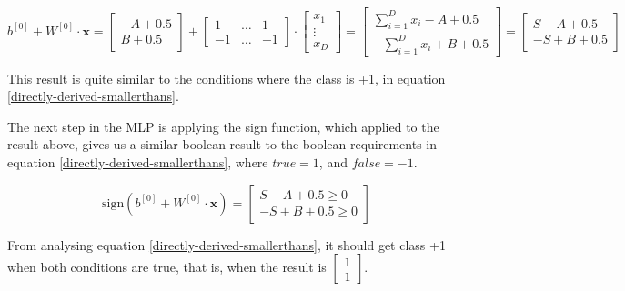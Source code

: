 \documentclass[12pt]{article}
\begin{document}
\begin{itemize}
        \[
            b^{[0]} + W^{[0]} \cdot \textbf{x} =
            \begin{bmatrix}
                -A+0.5 \\
                B+0.5
            \end{bmatrix}
            +
            \begin{bmatrix}
                1 & \hdots & 1 \\
                -1 & \hdots & -1
            \end{bmatrix}
            \cdot
            \begin{bmatrix}
                x_1 \\
                \vdots \\
                x_D
            \end{bmatrix}
            =
            \begin{bmatrix}
                \sum_{i=1}^{D} x_i  -A + 0.5\\
                -\sum_{i=1}^{D} x_i + B + 0.5
            \end{bmatrix}
            =
            \begin{bmatrix}
                S - A + 0.5\\
                -S + B + 0.5
            \end{bmatrix}
        \]

        This result is quite similar to the conditions where the class is +1, in equation \ref{directly-derived-smallerthans}.

        The next step in the MLP is applying the sign function, which applied to the result above, gives us a similar boolean result to the boolean requirements in equation \ref{directly-derived-smallerthans}, where $true = 1$, and $false = -1$.

        \[
            \text{sign}(b^{[0]} + W^{[0]} \cdot \textbf{x}) =
            \begin{bmatrix}
                S - A + 0.5 \geq 0 \\
                -S + B + 0.5 \geq 0
            \end{bmatrix}
        \]

        From analysing equation \ref{directly-derived-smallerthans}, it should get class +1 when both conditions are true, that is, when the result is $\begin{bmatrix}1\\1\end{bmatrix}$.


\end{itemize}
\end{document}
